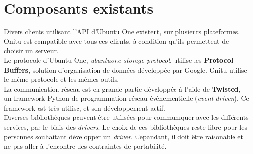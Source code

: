 \section{Composants existants}
\thispagestyle{EIP} %
Divers clients utilisant l'API d'Ubuntu One existent, sur plusieurs plateformes. Onitu est compatible avec tous ces clients, à condition qu'ils permettent de choisir un serveur.\\

Le protocole d'Ubuntu One, \textit{ubuntuone-storage-protocol}, utilise les \textbf{Protocol Buffers}, solution d'organisation de données développée par Google. Onitu utilise le même protocole et les mêmes outils.\\

La communication réseau est en grande partie développée à l'aide de \textbf{Twisted}, un framework Python de programmation réseau événementielle (\emph{event-driven}). Ce framework est très utilisé, et son développement actif.\\

Diverses bibliothèques peuvent être utilisées pour communiquer avec les différents services, par le biais des \textit{drivers}. Le choix de ces bibliothèques reste libre pour les personnes souhaitant développer un \textit{driver}. Cepandant, il doit être raisonable et ne pas aller à l'encontre des contraintes de portabilité.
